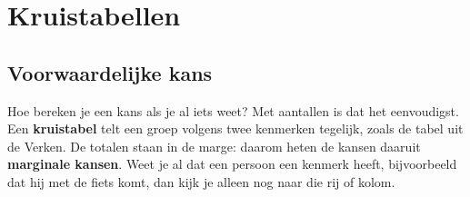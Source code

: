 \begin{oefeningen}[Start]

\end{oefeningen}


\section{Kruistabellen}

\subsection{Voorwaardelijke kans}

Hoe bereken je een kans als je al iets weet? Met aantallen is dat het eenvoudigst. Een \textbf{kruistabel} telt een groep volgens twee kenmerken tegelijk, zoals de tabel uit de Verken. De totalen staan in de marge: daarom heten de kansen daaruit \textbf{marginale kansen}. Weet je al dat een persoon een kenmerk heeft, bijvoorbeeld dat hij met de fiets komt, dan kijk je alleen nog naar die rij of kolom.

